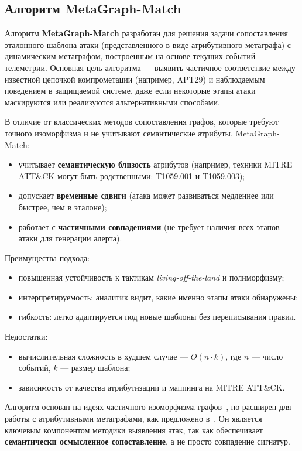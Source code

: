 \subsection{Алгоритм MetaGraph-Match}

Алгоритм \textbf{MetaGraph-Match} разработан для решения задачи сопоставления эталонного шаблона атаки (представленного в виде атрибутивного метаграфа) с динамическим метаграфом, построенным на основе текущих событий телеметрии. Основная цель алгоритма — выявить частичное соответствие между известной цепочкой компрометации (например, APT29) и наблюдаемым поведением в защищаемой системе, даже если некоторые этапы атаки маскируются или реализуются альтернативными способами.

В отличие от классических методов сопоставления графов, которые требуют точного изоморфизма и не учитывают семантические атрибуты, MetaGraph-Match:
\begin{itemize}
    \item учитывает \textbf{семантическую близость} атрибутов (например, техники MITRE ATT\&CK могут быть родственными: T1059.001 и T1059.003);
    \item допускает \textbf{временные сдвиги} (атака может развиваться медленнее или быстрее, чем в эталоне);
    \item работает с \textbf{частичными совпадениями} (не требует наличия всех этапов атаки для генерации алерта).
\end{itemize}
Преимущества подхода:
\begin{itemize}
    \item повышенная устойчивость к тактикам \textit{living-off-the-land} и полиморфизму;
    \item интерпретируемость: аналитик видит, какие именно этапы атаки обнаружены;
    \item гибкость: легко адаптируется под новые шаблоны без переписывания правил.
\end{itemize}
Недостатки:
\begin{itemize}
    \item вычислительная сложность в худшем случае — $O(n \cdot k)$, где $n$ — число событий, $k$ — размер шаблона;
    \item зависимость от качества атрибутизации и маппинга на MITRE ATT\&CK.
\end{itemize}

Алгоритм основан на идеях частичного изоморфизма графов~\cite{Sheyner2002}, но расширен для работы с атрибутивными метаграфами, как предложено в~\cite{Latypov2020}. Он является ключевым компонентом методики выявления атак, так как обеспечивает \textbf{семантически осмысленное сопоставление}, а не просто совпадение сигнатур.


